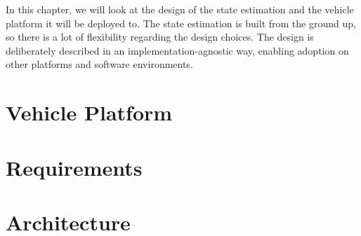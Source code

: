In this chapter, we will look at the design of the state estimation and the vehicle platform it will be deployed to. The state estimation is built from the ground up, so there is a lot of flexibility regarding the design choices. The design is deliberately described in an implementation-agnostic way, enabling adoption on other platforms and software environments.

\section{Vehicle Platform}


\section{Requirements}\label{sec:design-requirements}


\section{Architecture}

